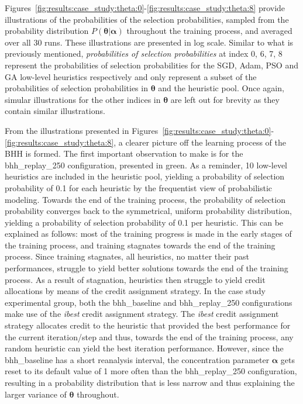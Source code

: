 Figures~\ref{fig:results:case_study:theta:0}-\ref{fig:results:case_study:theta:8} provide illustrations of the probabilities of the selection probabilities, sampled from the probability distribution $P(\boldsymbol{\theta} \vert \boldsymbol{\alpha})$ throughout the training process, and averaged over all 30 runs. These illustrations are presented in log scale. Similar to what is previously mentioned, \textit{probabilities of selection probabilities} at index 0, 6, 7, 8 represent the probabilities of selection probabilities for the \acs{SGD}, \acs{Adam}, \acs{PSO} and \acs{GA} low-level heuristics respectively and only represent a subset of the probabilities of selection probabilities in $\boldsymbol{\theta}$ and the heuristic pool. Once again, simular illustrations for the other indices in $\boldsymbol{\theta}$ are left out for brevity as they contain similar illustrations.

From the illustrations presented in Figures~\ref{fig:results:case_study:theta:0}-\ref{fig:results:case_study:theta:8}, a clearer picture off the learning process of the \acs{BHH} is formed. The first important observation to make is for the bhh\_replay\_250 configuration, presented in green. As a reminder, 10 low-level heuristics are included in the heuristic pool, yielding a probability of selection probability of 0.1 for each heuristic by the frequentist view of probabilistic modeling. Towards the end of the training process, the probability of selection probability converges back to the symmetrical, uniform probability distribution, yielding a probability of selection probability of 0.1 per heuristic. This can be explained as follows: most of the training progress is made in the early stages of the training process, and training stagnates towards the end of the training process. Since training stagnates, all heuristics, no matter their past performances, struggle to yield better solutions towards the end of the training process. As a result of stagnation, heuristics then struggle to yield credit allocations by means of the credit assignment strategy. In the case study experimental group, both the bhh\_baseline and bhh\_replay\_250 configurations make use of the \textit{ibest} credit assignment strategy. The \textit{ibest} credit assignment strategy allocates credit to the heuristic that provided the best performance for the current iteration/step and thus, towards the end of the training process, any random heuristic can yield the best iteration performance. However, since the bhh\_baseline has a short reanalysis interval, the concentration parameter $\boldsymbol{\alpha}$ gets reset to its default value of 1 more often than the bhh\_replay\_250 configuration, resulting in a probability distribution that is less narrow and thus explaining the larger variance of $\boldsymbol{\theta}$ throughout.


